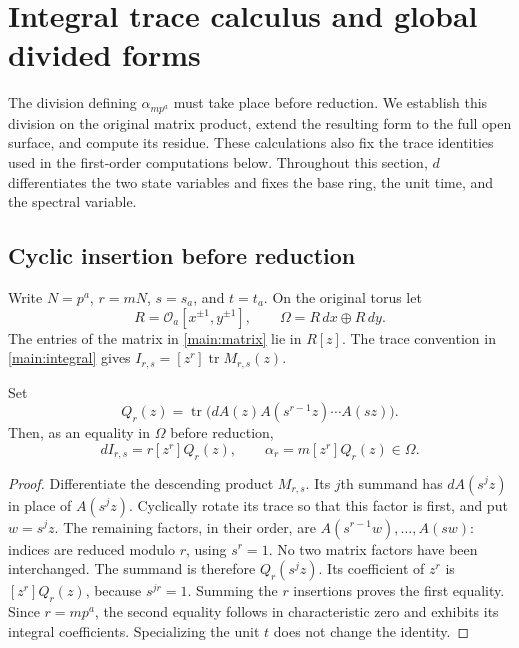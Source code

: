 \section{Integral trace calculus and global divided forms}
\label{trace:section}

The division defining $\alpha_{mp^a}$ must take place before reduction.
We establish this division on the original matrix product, extend the resulting
form to the full open surface, and compute its residue. These calculations
also fix the trace identities used in the first-order computations below.
Throughout this section, $d$ differentiates the two state variables and fixes
the base ring, the unit time, and the spectral variable.

\subsection{Cyclic insertion before reduction}

Write $N=p^a$, $r=mN$, $s=s_a$, and $t=t_a$. On the original torus let
\[
 R=\mathcal O_a[x^{\pm1},y^{\pm1}],\qquad
 \Omega=R\,dx\oplus R\,dy.
\]
The entries of the matrix in \eqref{main:matrix} lie in $R[z]$.
The trace convention in \eqref{main:integral} gives
$I_{r,s}=[z^r]\operatorname{tr}M_{r,s}(z)$.

\begin{lemma}
\label{trace:insertion}
Set
\[
 Q_r(z)=\operatorname{tr}\bigl(
 dA(z)A(s^{r-1}z)\cdots A(sz)\bigr).
\]
Then, as an equality in $\Omega$ before reduction,
\begin{equation}
 dI_{r,s}=r[z^r]Q_r(z),\qquad
 \alpha_{r}=m[z^r]Q_r(z)\in\Omega.
 \label{trace:integral-insertion}
\end{equation}
\end{lemma}

\begin{proof}
Differentiate the descending product $M_{r,s}$. Its $j$th summand has
$dA(s^jz)$ in place of $A(s^jz)$. Cyclically rotate its trace so that this
factor is first, and put $w=s^jz$. The remaining factors, in their order,
are $A(s^{r-1}w),\ldots,A(sw)$: indices are reduced modulo $r$, using
$s^r=1$. No two matrix factors have been interchanged. The summand is
therefore $Q_r(s^jz)$. Its coefficient of $z^r$ is $[z^r]Q_r(z)$,
because $s^{jr}=1$. Summing the $r$ insertions proves the first equality.
Since $r=mp^a$, the second equality follows in characteristic zero and
exhibits its integral coefficients. Specializing the unit $t$ does not
change the identity.
\end{proof}

